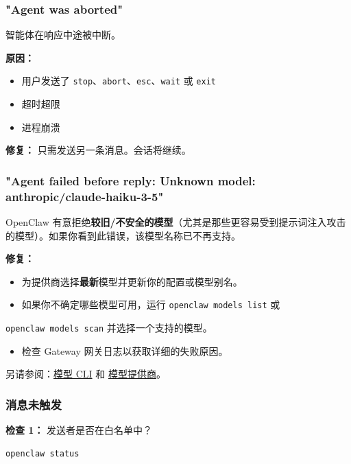 \subsubsection{"Agent was aborted"}


智能体在响应中途被中断。

\textbf{原因：}

\begin{itemize}
  \item 用户发送了 \texttt{stop}、\texttt{abort}、\texttt{esc}、\texttt{wait} 或 \texttt{exit}
  \item 超时超限
  \item 进程崩溃
\end{itemize}


\textbf{修复：} 只需发送另一条消息。会话将继续。

\subsubsection{"Agent failed before reply: Unknown model: anthropic/claude-haiku-3-5"}


OpenClaw 有意拒绝\textbf{较旧/不安全的模型}（尤其是那些更容易受到提示词注入攻击的模型）。如果你看到此错误，该模型名称已不再支持。

\textbf{修复：}

\begin{itemize}
  \item 为提供商选择\textbf{最新}模型并更新你的配置或模型别名。
  \item 如果你不确定哪些模型可用，运行 \texttt{openclaw models list} 或
\end{itemize}

\texttt{openclaw models scan} 并选择一个支持的模型。
\begin{itemize}
  \item 检查 Gateway 网关日志以获取详细的失败原因。
\end{itemize}


另请参阅：\href{/cli/models}{模型 CLI} 和 \href{/concepts/model-providers}{模型提供商}。

\subsubsection{消息未触发}


\textbf{检查 1：} 发送者是否在白名单中？

\begin{lstlisting}[language=bash]
openclaw status
\end{lstlisting}


